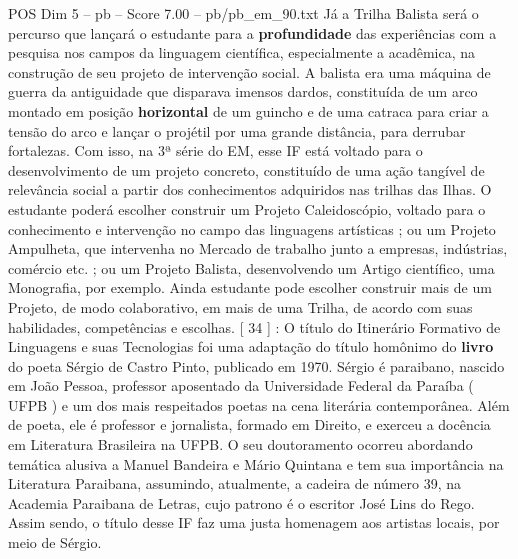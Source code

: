 \begin{textsample}{POS Dim 5 – pb – Score 7.00 – pb/pb\_em\_90.txt}
Já a Trilha Balista será o percurso que lançará o estudante para a \textbf{profundidade} das experiências com a pesquisa nos campos da linguagem científica, especialmente a acadêmica, na construção de seu projeto de intervenção social.
A balista era uma máquina de guerra da antiguidade que disparava imensos dardos, constituída de um arco montado em posição \textbf{horizontal} de um guincho e de uma catraca para criar a tensão do arco e lançar o projétil por uma grande distância, para derrubar fortalezas.
Com isso, na 3ª série do EM, esse IF está voltado para o desenvolvimento de um projeto concreto, constituído de uma ação tangível de relevância social a partir dos conhecimentos adquiridos nas trilhas das Ilhas.
O estudante poderá escolher construir um Projeto Caleidoscópio, voltado para o conhecimento e intervenção no campo das linguagens artísticas ; ou um Projeto Ampulheta, que intervenha no Mercado de trabalho junto a empresas, indústrias, comércio etc. ; ou um Projeto Balista, desenvolvendo um Artigo científico, uma Monografia, por exemplo.
Ainda estudante pode escolher construir mais de um Projeto, de modo colaborativo, em mais de uma Trilha, de acordo com suas habilidades, competências e escolhas. [ 34 ] : O título do Itinerário Formativo de Linguagens e suas Tecnologias foi uma adaptação do título homônimo do \textbf{livro} do poeta Sérgio de Castro Pinto, publicado em 1970.
Sérgio é paraibano, nascido em João Pessoa, professor aposentado da Universidade Federal da Paraíba ( UFPB ) e um dos mais respeitados poetas na cena literária contemporânea.
Além de poeta, ele é professor e jornalista, formado em Direito, e exerceu a docência em Literatura Brasileira na UFPB.
O seu doutoramento ocorreu abordando temática alusiva a Manuel Bandeira e Mário Quintana e tem sua importância na Literatura Paraibana, assumindo, atualmente, a cadeira de número 39, na Academia Paraibana de Letras, cujo patrono é o escritor José Lins do Rego.
Assim sendo, o título desse IF faz uma justa homenagem aos artistas locais, por meio de Sérgio.

\end{textsample}
